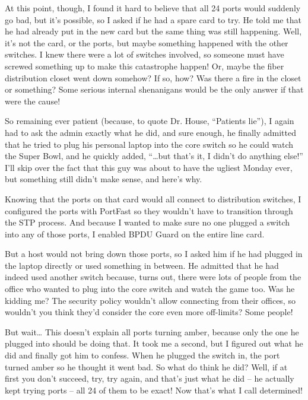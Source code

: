 \documentclass[b5paper,11pt]{memoir}
\begin{document}
At this point, though, I found it hard to believe that all 24 ports
would suddenly go bad, but it's possible, so I asked if he had a spare
card to try. He told me that he had already put in the new card but the
same thing was still happening. Well, it's not the card, or the ports,
but maybe something happened with the other switches. I knew there were
a lot of switches involved, so someone must have screwed something up to
make this catastrophe happen! Or, maybe the fiber distribution closet
went down somehow? If so, how? Was there a fire in the closet or
something? Some serious internal shenanigans would be the only answer if
that were the cause!

So remaining ever patient (because, to quote Dr. House, ``Patients
lie''), I again had to ask the admin exactly what he did, and sure
enough, he finally admitted that he tried to plug his personal laptop
into the core switch so he could watch the Super Bowl, and he quickly
added, ``\ldots but that's it, I didn't do anything else!'' I'll skip
over the fact that this guy was about to have the ugliest Monday ever,
but something still didn't make sense, and here's why.

Knowing that the ports on that card would all connect to distribution
switches, I configured the ports with PortFast so they wouldn't have to
transition through the STP process. And because I wanted to make sure no
one plugged a switch into any of those ports, I enabled BPDU Guard on
the entire line card.

But a host would not bring down those ports, so I asked him if he had
plugged in the laptop directly or used something in between. He admitted
that he had indeed used another switch because, turns out, there were
lots of people from the office who wanted to plug into the core switch
and watch the game too. Was he kidding me? The security policy wouldn't
allow connecting from their offices, so wouldn't you think they'd
consider the core even more off-limits? Some people!

But wait\ldots{} This
doesn't explain all ports turning amber, because only the one he plugged
into should be doing that. It took me a second, but I figured out what
he did and finally got him to confess. When he plugged the switch in,
the port turned amber so he thought it went bad. So what do think he
did? Well, if at first you don't succeed, try, try again, and that's
just what he did -- he actually kept trying ports -- all 24 of them to be
exact! Now that's what I call determined!
\end{document}
